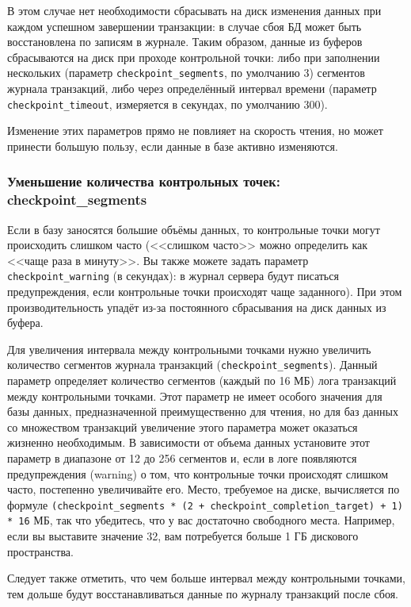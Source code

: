 В этом случае нет необходимости сбрасывать на диск изменения данных при каждом успешном завершении транзакции: в случае сбоя БД может быть восстановлена по записям в журнале. Таким образом, данные из буферов сбрасываются на диск при проходе контрольной точки: либо при заполнении нескольких (параметр \lstinline!checkpoint_segments!, по умолчанию 3) сегментов журнала транзакций, либо через определённый интервал времени (параметр \lstinline!checkpoint_timeout!, измеряется в секундах, по умолчанию 300).

Изменение этих параметров прямо не повлияет на скорость чтения, но может принести большую пользу, если данные в базе активно изменяются.


\subsubsection{Уменьшение количества контрольных точек: checkpoint\_segments}


Если в базу заносятся большие объёмы данных, то контрольные точки могут происходить слишком часто (<<слишком часто>> можно определить как <<чаще раза в минуту>>. Вы также можете задать параметр \lstinline!checkpoint_warning! (в секундах): в журнал сервера будут писаться предупреждения, если контрольные точки происходят чаще заданного). При этом производительность упадёт из-за постоянного сбрасывания на диск данных из буфера.

Для увеличения интервала между контрольными точками нужно увеличить количество сегментов журнала транзакций (\lstinline!checkpoint_segments!). Данный параметр определяет количество сегментов (каждый по 16 МБ) лога транзакций между контрольными точками. Этот параметр не имеет особого значения для базы данных, предназначенной преимущественно для чтения, но для баз данных со множеством транзакций увеличение этого параметра может оказаться жизненно необходимым. В зависимости от объема данных установите этот параметр в диапазоне от 12 до 256 сегментов и, если в логе появляются предупреждения (warning) о том, что контрольные точки происходят слишком часто, постепенно увеличивайте его. Место, требуемое на диске, вычисляется по формуле \lstinline!(checkpoint_segments * (2 + checkpoint_completion_target) + 1) * 16! МБ, так что убедитесь, что у вас достаточно свободного места. Например, если вы выставите значение 32, вам потребуется больше 1 ГБ дискового пространства.

Следует также отметить, что чем больше интервал между контрольными точками, тем дольше будут восстанавливаться данные по журналу транзакций после сбоя.

